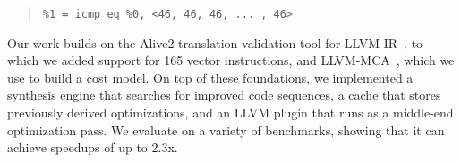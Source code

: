 {\small\begin{quote}
\begin{verbatim}
%1 = icmp eq %0, <46, 46, 46, ... , 46>
\end{verbatim}
\end{quote}}

Our work builds on the Alive2 translation validation tool for LLVM
IR~\cite{alive2}, to which we added support for 165 vector
instructions, and LLVM-MCA~\cite{llvmmca}, which we use to build a
cost model.
%
On top of these foundations, we implemented a synthesis engine that
searches for improved code sequences, a cache that stores previously
derived optimizations, and an LLVM plugin that runs as a middle-end
optimization pass.
%
We evaluate \tool{} on a variety of benchmarks, showing that it can
achieve speedups of up to 2.3x.
